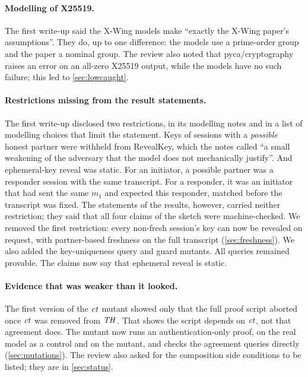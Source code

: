 \paragraph{Modelling of X25519.} The first write-up said the X-Wing models
make ``exactly the X-Wing paper's assumptions''. They do, up to one
difference: the models use a prime-order group and the paper a nominal
group. The review also noted that pyca/cryptography raises an error on an
all-zero X25519 output, while the models have no such failure; this led to
\cref{sec:lowcaught}.

\paragraph{Restrictions missing from the result statements.} The first
write-up disclosed two restrictions, in its modelling notes and in a list of
modelling choices that limit the statement. Keys of sessions with a
\emph{possible} honest partner were withheld from RevealKey, which the notes
called ``a small weakening of the adversary that the model does not
mechanically justify''. And ephemeral-key reveal was static. For an
initiator, a possible partner was a responder session with the same
transcript. For a responder, it was an initiator that had sent the same
$m_1$ and expected this responder, matched before the transcript was fixed.
The statements of the results, however, carried neither restriction; they
said that all four claims of the sketch were machine-checked. We removed the
first
restriction: every non-fresh session's key can now be revealed on request,
with partner-based freshness on the full transcript (\cref{sec:freshness}).
We also added the key-uniqueness query and guard mutants. All queries
remained provable. The claims now say that ephemeral reveal is static.

\paragraph{Evidence that was weaker than it looked.} The first version of the
$\mathit{ct}$ mutant showed only that the full proof script aborted once $\mathit{ct}$ was
removed from $\mathit{TH}$. That shows the script depends on $\mathit{ct}$, not that
agreement does. The mutant now runs an authentication-only proof, on the
real model as a control and on the mutant, and checks the agreement queries
directly (\cref{sec:mutations}). The review also asked for the composition
side conditions to be listed; they are in \cref{sec:status}.

